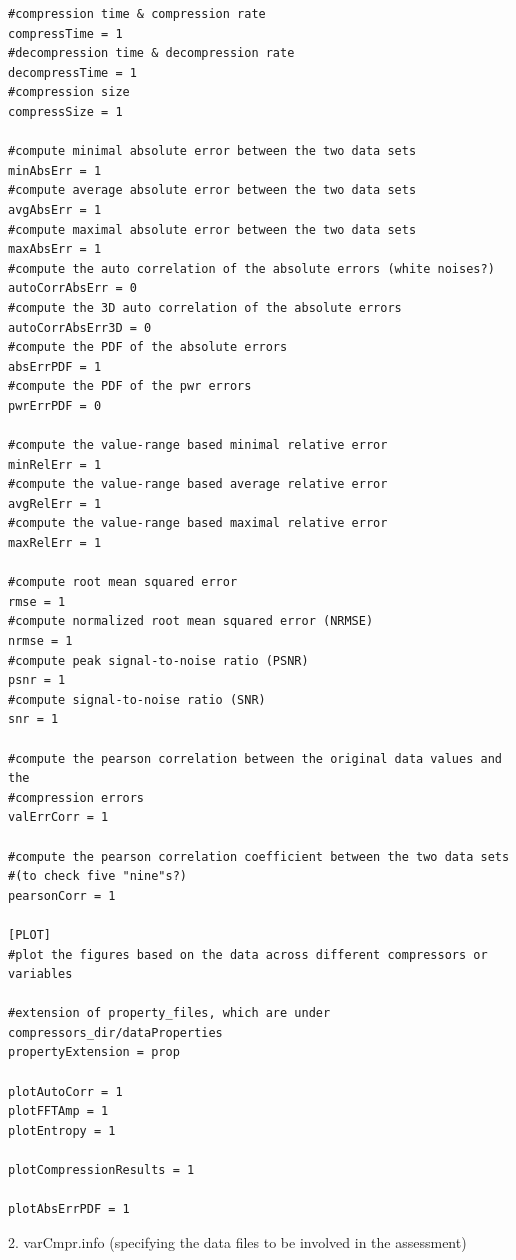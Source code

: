 \begin{lstlisting}[style=ShellStyleInline, basicstyle =\footnotesize\ttfamily]
#compression time & compression rate
compressTime = 1
#decompression time & decompression rate
decompressTime = 1
#compression size
compressSize = 1

#compute minimal absolute error between the two data sets
minAbsErr = 1
#compute average absolute error between the two data sets
avgAbsErr = 1
#compute maximal absolute error between the two data sets
maxAbsErr = 1
#compute the auto correlation of the absolute errors (white noises?)
autoCorrAbsErr = 0
#compute the 3D auto correlation of the absolute errors
autoCorrAbsErr3D = 0
#compute the PDF of the absolute errors
absErrPDF = 1
#compute the PDF of the pwr errors
pwrErrPDF = 0

#compute the value-range based minimal relative error
minRelErr = 1
#compute the value-range based average relative error
avgRelErr = 1
#compute the value-range based maximal relative error
maxRelErr = 1

#compute root mean squared error
rmse = 1
#compute normalized root mean squared error (NRMSE)
nrmse = 1
#compute peak signal-to-noise ratio (PSNR)
psnr = 1
#compute signal-to-noise ratio (SNR)
snr = 1

#compute the pearson correlation between the original data values and the
#compression errors
valErrCorr = 1

#compute the pearson correlation coefficient between the two data sets
#(to check five "nine"s?)
pearsonCorr = 1

[PLOT]
#plot the figures based on the data across different compressors or variables

#extension of property_files, which are under compressors_dir/dataProperties
propertyExtension = prop

plotAutoCorr = 1
plotFFTAmp = 1
plotEntropy = 1

plotCompressionResults = 1

plotAbsErrPDF = 1
\end{lstlisting}

2. varCmpr.info (specifying the data files to be involved in the assessment)

